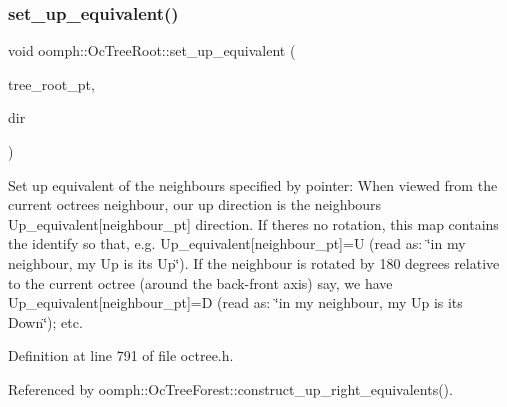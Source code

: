 \mbox{\label{classoomph_1_1OcTreeRoot_a91210b8fab8bb9f092518303551e0c33}} 
\subsubsection{\texorpdfstring{set\+\_\+up\+\_\+equivalent()}{set\_up\_equivalent()}}
{\footnotesize\ttfamily void oomph\+::\+Oc\+Tree\+Root\+::set\+\_\+up\+\_\+equivalent (\begin{DoxyParamCaption}\item[{\hyperlink{classoomph_1_1TreeRoot}{Tree\+Root} $\ast$}]{tree\+\_\+root\+\_\+pt,  }\item[{const int \&}]{dir }\end{DoxyParamCaption})\hspace{0.3cm}{\ttfamily [inline]}}



Set up equivalent of the neighbours specified by pointer\+: When viewed from the current octree\textquotesingle{}s neighbour, our up direction is the neighbour\textquotesingle{}s Up\+\_\+equivalent\mbox{[}neighbour\+\_\+pt\mbox{]} direction. If there\textquotesingle{}s no rotation, this map contains the identify so that, e.\+g. {\ttfamily Up\+\_\+equivalent}\mbox{[}neighbour\+\_\+pt\mbox{]}=U (read as\+: \char`\"{}in my
neighbour, my Up is its Up\char`\"{}). If the neighbour is rotated by 180 degrees relative to the current octree (around the back-\/front axis) say, we have {\ttfamily Up\+\_\+equivalent}\mbox{[}neighbour\+\_\+pt\mbox{]}=D (read as\+: \char`\"{}in my 
neighbour, my Up is its Down\char`\"{}); etc. 



Definition at line 791 of file octree.\+h.



Referenced by oomph\+::\+Oc\+Tree\+Forest\+::construct\+\_\+up\+\_\+right\+\_\+equivalents().

\mbox{\label{classoomph_1_1OcTreeRoot_a961a28583236f1b92bc35de064d2dba6}} 
